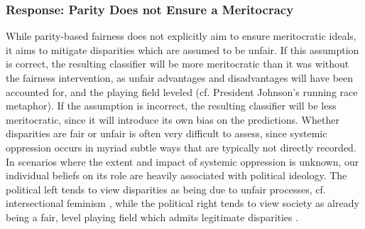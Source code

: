 \documentclass[11pt,dvipdfm]{article}
\begin{document}
\subsubsection{Response: Parity Does not Ensure a Meritocracy}
\label{sec:responseMeritocracy}
While parity-based fairness does not explicitly aim to ensure meritocratic ideals, it aims to mitigate disparities which are assumed to be unfair.  If this assumption is correct, the resulting classifier will be more meritocratic than it was without the fairness intervention, as unfair advantages and disadvantages will have been accounted for, and the playing field leveled (cf. President Johnson's running race metaphor).  If the assumption is incorrect, the resulting classifier will be less meritocratic, since it will introduce its own bias on the predictions.  Whether disparities are fair or unfair is often very difficult to assess, since systemic oppression occurs in myriad subtle ways that are typically not directly recorded.  In scenarios where the extent and impact of systemic oppression is unknown, our individual beliefs on its role 
are heavily associated with political ideology.  The political left tends to view disparities as being due to unfair processes, cf. intersectional feminism \cite{crenshaw1989demarginalizing}, while the political right tends to view society as already being a fair, level playing field which admits legitimate disparities \cite{dionne2004americans}.  
\end{document}
